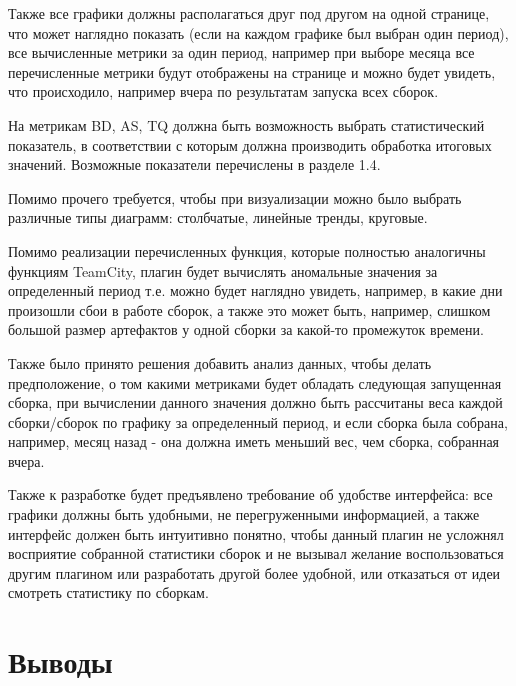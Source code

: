 Также все графики должны располагаться друг под другом на одной странице, что может наглядно показать (если на каждом графике был выбран один период), все вычисленные метрики за один период, например при выборе месяца все перечисленные метрики будут отображены на странице и можно будет увидеть, что происходило, например вчера по результатам запуска всех сборок.

На метрикам BD, AS, TQ должна быть возможность выбрать статистический показатель, в соответствии с которым должна производить обработка итоговых значений. Возможные показатели перечислены в разделе 1.4.

Помимо прочего требуется, чтобы при визуализации можно было выбрать различные типы диаграмм: столбчатые, линейные тренды, круговые.

Помимо реализации перечисленных функция, которые полностью аналогичны функциям TeamCity, плагин будет вычислять аномальные значения за определенный период т.е. можно будет наглядно увидеть, например, в какие дни произошли сбои в работе сборок, а также это может быть, например, слишком большой размер артефактов у одной сборки за какой-то промежуток времени.

Также было принято решения добавить анализ данных, чтобы делать предположение, о том какими метриками будет обладать следующая запущенная сборка, при вычислении данного значения должно быть рассчитаны веса каждой сборки/сборок по графику за определенный период, и если сборка была собрана, например, месяц назад - она должна иметь меньший вес, чем сборка, собранная вчера.

Также к разработке будет предъявлено требование об удобстве интерфейса: все графики должны быть удобными, не перегруженными информацией, а также интерфейс должен быть интуитивно понятно, чтобы данный плагин не усложнял восприятие собранной статистики сборок и не вызывал желание воспользоваться другим плагином или разработать другой более удобной, или отказаться от идеи смотреть статистику по сборкам.

\section{Выводы} \label{ch1:sec7}

